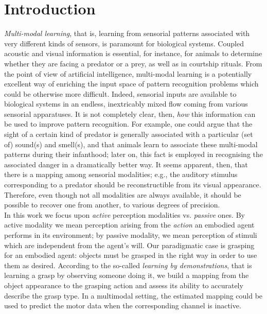 \section{Introduction}
\label{sec:intro}

\emph{Multi-modal learning}, that is, learning from sensorial patterns associated with very different kinds of sensors, is paramount for biological systems. Coupled acoustic and visual information is essential, for instance, for animals to determine whether they are facing a predator or a prey, as well as in courtship rituals. From the point of view of artificial intelligence, multi-modal learning is a potentially excellent way of enriching the input space of pattern recognition problems which could be otherwise more difficult.
Indeed, sensorial inputs are available to biological systems in an endless, inextricably mixed flow coming from various sensorial apparatuses. It is not completely clear, then, \emph{how} this information can be used to improve pattern recognition. For example, one could argue that the sight of a certain kind of predator is generally associated with a particular (set of) sound(s) and smell(s), and that animals learn to associate these multi-modal patterns during their infanthood; later on, this fact is employed in recognising the associated danger in a dramatically better way. It seems apparent, then, that there is a mapping among sensorial modalities; e.g., the auditory stimulus corresponding to a predator should be reconstructible from its visual appearance. Therefore, even though not all modalities are always available, it should be possible to recover one from another, to various degrees of precision.\\
In this work we focus upon \emph{active} perception modalities vs. \emph{passive} ones. By active modality we mean perception arising from the \emph{action} an embodied agent performs in its environment; by passive modality, we mean perception of stimuli which are independent from the agent's will. 
Our paradigmatic case is grasping for an embodied agent: objects must be grasped in the right way in order to use them as desired. 
According to the so-called {\em learning by demonstrations}, that is learning a grasp by observing someone doing it, we build a mapping from the object appearance to the grasping action and assess its ability to accurately describe the grasp type.
In a multimodal setting, the estimated mapping could be used to predict the motor data when the corresponding channel is inactive. 


